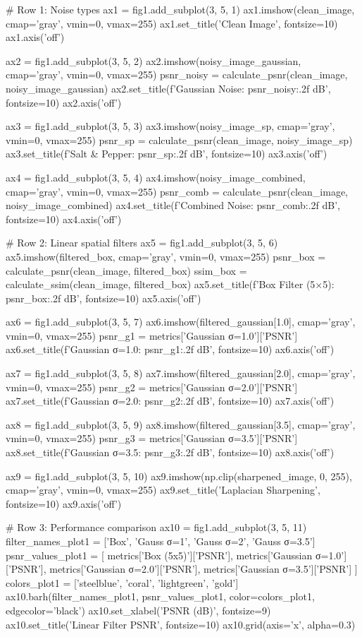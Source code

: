 \documentclass[a4paper, 11pt]{article}
\begin{document}
\begin{pycode}
# Row 1: Noise types
ax1 = fig1.add_subplot(3, 5, 1)
ax1.imshow(clean_image, cmap='gray', vmin=0, vmax=255)
ax1.set_title('Clean Image', fontsize=10)
ax1.axis('off')

ax2 = fig1.add_subplot(3, 5, 2)
ax2.imshow(noisy_image_gaussian, cmap='gray', vmin=0, vmax=255)
psnr_noisy = calculate_psnr(clean_image, noisy_image_gaussian)
ax2.set_title(f'Gaussian Noise\nPSNR: {psnr_noisy:.2f} dB', fontsize=10)
ax2.axis('off')

ax3 = fig1.add_subplot(3, 5, 3)
ax3.imshow(noisy_image_sp, cmap='gray', vmin=0, vmax=255)
psnr_sp = calculate_psnr(clean_image, noisy_image_sp)
ax3.set_title(f'Salt \& Pepper\nPSNR: {psnr_sp:.2f} dB', fontsize=10)
ax3.axis('off')

ax4 = fig1.add_subplot(3, 5, 4)
ax4.imshow(noisy_image_combined, cmap='gray', vmin=0, vmax=255)
psnr_comb = calculate_psnr(clean_image, noisy_image_combined)
ax4.set_title(f'Combined Noise\nPSNR: {psnr_comb:.2f} dB', fontsize=10)
ax4.axis('off')

# Row 2: Linear spatial filters
ax5 = fig1.add_subplot(3, 5, 6)
ax5.imshow(filtered_box, cmap='gray', vmin=0, vmax=255)
psnr_box = calculate_psnr(clean_image, filtered_box)
ssim_box = calculate_ssim(clean_image, filtered_box)
ax5.set_title(f'Box Filter (5×5)\nPSNR: {psnr_box:.2f} dB', fontsize=10)
ax5.axis('off')

ax6 = fig1.add_subplot(3, 5, 7)
ax6.imshow(filtered_gaussian[1.0], cmap='gray', vmin=0, vmax=255)
psnr_g1 = metrics['Gaussian σ=1.0']['PSNR']
ax6.set_title(f'Gaussian σ=1.0\nPSNR: {psnr_g1:.2f} dB', fontsize=10)
ax6.axis('off')

ax7 = fig1.add_subplot(3, 5, 8)
ax7.imshow(filtered_gaussian[2.0], cmap='gray', vmin=0, vmax=255)
psnr_g2 = metrics['Gaussian σ=2.0']['PSNR']
ax7.set_title(f'Gaussian σ=2.0\nPSNR: {psnr_g2:.2f} dB', fontsize=10)
ax7.axis('off')

ax8 = fig1.add_subplot(3, 5, 9)
ax8.imshow(filtered_gaussian[3.5], cmap='gray', vmin=0, vmax=255)
psnr_g3 = metrics['Gaussian σ=3.5']['PSNR']
ax8.set_title(f'Gaussian σ=3.5\nPSNR: {psnr_g3:.2f} dB', fontsize=10)
ax8.axis('off')

ax9 = fig1.add_subplot(3, 5, 10)
ax9.imshow(np.clip(sharpened_image, 0, 255), cmap='gray', vmin=0, vmax=255)
ax9.set_title('Laplacian Sharpening', fontsize=10)
ax9.axis('off')

# Row 3: Performance comparison
ax10 = fig1.add_subplot(3, 5, 11)
filter_names_plot1 = ['Box', 'Gauss σ=1', 'Gauss σ=2', 'Gauss σ=3.5']
psnr_values_plot1 = [
    metrics['Box (5x5)']['PSNR'],
    metrics['Gaussian σ=1.0']['PSNR'],
    metrics['Gaussian σ=2.0']['PSNR'],
    metrics['Gaussian σ=3.5']['PSNR']
]
colors_plot1 = ['steelblue', 'coral', 'lightgreen', 'gold']
ax10.barh(filter_names_plot1, psnr_values_plot1, color=colors_plot1, edgecolor='black')
ax10.set_xlabel('PSNR (dB)', fontsize=9)
ax10.set_title('Linear Filter PSNR', fontsize=10)
ax10.grid(axis='x', alpha=0.3)


\end{pycode}
\end{document}
